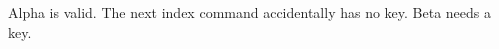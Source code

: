 \documentclass{article}
\begin{document}
Alpha is valid.
The next index command accidentally has no key.
Beta\index{} needs a key.
\printindex
\end{document}
